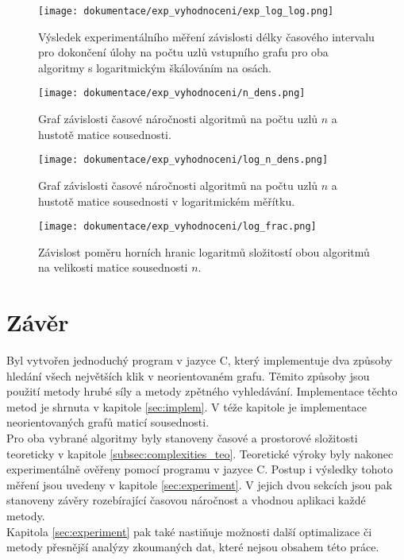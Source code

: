 \documentclass[a4paper]{article}
\begin{document}
        \begin{figure}[H]
            \centering
            \texttt{[image: dokumentace/exp\_vyhodnoceni/exp\_log\_log.png]}
            \caption{Výsledek experimentálního měření závislosti délky časového intervalu pro dokončení úlohy na počtu uzlů vstupního grafu pro oba algoritmy s logaritmickým škálováním na osách.}
            \label{fig:exp_n_loglog}
        \end{figure}
        
        \begin{sidewaysfigure}
            \centering
            \texttt{[image: dokumentace/exp\_vyhodnoceni/n\_dens.png]}
            \caption{Graf závislosti časové náročnosti algoritmů na počtu uzlů $n$ a hustotě matice sousednosti.}
            \label{fig:n_rho_lin}
        \end{sidewaysfigure}

        \begin{sidewaysfigure}
            \centering
            \texttt{[image: dokumentace/exp\_vyhodnoceni/log\_n\_dens.png]}
            \caption{Graf závislosti časové náročnosti algoritmů na počtu uzlů $n$ a hustotě matice sousednosti v logaritmickém měřítku.}
            \label{fig:n_rho_log}
        \end{sidewaysfigure}

        \begin{figure}
            \centering
            \texttt{[image: dokumentace/exp\_vyhodnoceni/log\_frac.png]}
            \caption{Závislost poměru horních hranic logaritmů složitostí obou algoritmů na velikosti matice sousednosti $n$.}
            \label{fig:log_frac}
        \end{figure}

\section{Závěr}
    Byl vytvořen jednoduchý program v jazyce C, který implementuje dva způsoby hledání všech největších klik v neorientovaném grafu. Těmito způsoby jsou použití metody hrubé síly a metody zpětného vyhledávání. Implementace těchto metod je shrnuta v kapitole \ref{sec:implem}. V téže kapitole je implementace neorientovaných grafů maticí sousednosti.\\

    \noindent
    Pro oba vybrané algoritmy byly stanoveny časové a prostorové složitosti teoreticky v kapitole \ref{subsec:complexities_teo}. Teoretické výroky byly nakonec experimentálně ověřeny pomocí programu v jazyce C. Postup i výsledky tohoto měření jsou uvedeny v kapitole \ref{sec:experiment}. V jejich dvou sekcích jsou pak stanoveny závěry rozebírající časovou náročnost a vhodnou aplikaci každé metody.\\

    \noindent
    Kapitola \ref{sec:experiment} pak také nastiňuje možnosti další optimalizace či metody přesnější analýzy zkoumaných dat, které nejsou obsahem této práce.
    

    


\newpage
\lstlistoflistings
\listoffigures
\end{document}
